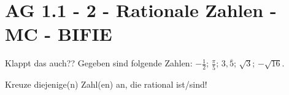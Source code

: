 \section{AG 1.1 - 2 - Rationale Zahlen - MC - BIFIE}

\begin{beispiel}[AG 1.1]{1} %
Klappt das auch??
Gegeben sind folgende Zahlen: $-\frac{1}{2}$; $\frac{\pi}{5}$; $3,\overline{5}$; $\sqrt{3}$; $-\sqrt{16}$.

Kreuze diejenige(n) Zahl(en) an, die rational ist/sind!
\end{beispiel}
